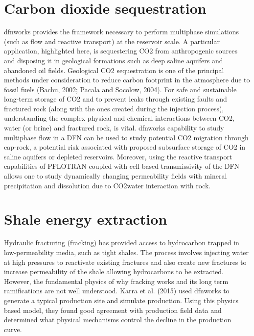 \documentclass[letterpaper,10pt,english]{sphinxmanual}
\begin{document}
\section{Carbon dioxide sequestration}
\label{\detokenize{applications:carbon-dioxide-sequestration}}
dfnworks provides the framework necessary to perform multiphase simulations (such as flow and reactive transport) at the reservoir scale. A particular application, highlighted here, is sequestering CO2 from anthropogenic sources and disposing it in geological formations such as deep saline aquifers and abandoned oil fields. Geological CO2 sequestration is one of the principal methods under consideration to reduce carbon footprint in the atmosphere due to fossil fuels (Bachu, 2002; Pacala and Socolow, 2004). For safe and sustainable long-term storage of CO2 and to prevent leaks through existing faults and fractured rock (along with the ones created during the injection process), understanding the complex physical and chemical interactions between CO2, water (or brine) and fractured rock, is vital. dfnworks capability to study multiphase flow in a DFN can be used to study potential CO2 migration through cap-rock, a potential risk associated with proposed subsurface storage of CO2 in saline aquifers or depleted reservoirs. Moreover, using the reactive transport capabilities of PFLOTRAN coupled with cell-based transmissivity of the DFN allows one to study dynamically changing permeability fields with mineral precipitation and dissolution due to CO2\textendash{}water interaction with rock.


\section{Shale energy extraction}
\label{\detokenize{applications:shale-energy-extraction}}
Hydraulic fracturing (fracking) has provided access to hydrocarbon trapped in low-permeability media, such as tight shales. The process involves injecting water at high pressures to reactivate existing fractures and also create new fractures to increase permeability of the shale allowing hydrocarbons to be extracted. However, the fundamental physics of why fracking works and its long term ramifications are not well understood. Karra et al. (2015) used dfnworks to generate a typical production site and simulate production. Using this physics based model, they found good agreement with production field data and determined what physical mechanisms control the decline in the production curve.
\end{document}
